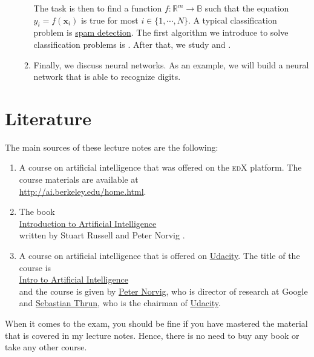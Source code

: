 \begin{enumerate}
\begin{enumerate}
            The task is then to find a function $f:\mathbb{R}^m \rightarrow \mathbb{B}$
            such that the equation $y_i = f(\mathbf{x}_i)$ is true for most $i\in\{1,\cdots,N\}$.  A typical
            classification problem is \href{https://en.wikipedia.org/wiki/Email_spam}{spam detection}.  The
            first algorithm we introduce to solve classification problems is .
            After that, we study  and .
      \item Finally, we discuss neural networks.  As an example, we will build a neural network that is able to
            recognize digits. 
      \end{enumerate}
\end{enumerate}
\pagebreak

\section{Literature}
The main sources of these lecture notes are the following:
\begin{enumerate}
\item A course on artificial intelligence that was offered on the \textsc{edX} platform.  The course
      materials are available at  
      \\[0.2cm]
      \hspace*{1.3cm}
      \href{http://ai.berkeley.edu/home.html}{http://ai.berkeley.edu/home.html}.
\item The book
      \\[0.2cm]
      \hspace*{1.3cm}
      \href{https://www.amazon.de/Artificial-Intelligence-Modern-Approach-Global/dp/1292401133/}{Introduction to Artificial Intelligence}
      \\[0.2cm]
      written by Stuart Russell and Peter Norvig \cite{russell:2020}.
\item A course on artificial intelligence that is offered on \href{https://www.udacity.com}{Udacity}.  The title of the
      course is
      \\[0.2cm]
      \hspace*{1.3cm}
      \href{https://www.udacity.com/course/intro-to-artificial-intelligence--cs271}{Intro to Artificial Intelligence}
      \\[0.2cm]
      and the course is given by \href{https://en.wikipedia.org/wiki/Peter_Norvig}{Peter Norvig}, who is
      director of research at Google and \href{https://en.wikipedia.org/wiki/Sebastian_Thrun}{Sebastian Thrun},
      who is the chairman of \href{https://www.udacity.com}{Udacity}.
\end{enumerate}
When it comes to the exam, you should be fine if you have mastered the material that is covered in my
lecture notes.  Hence, there is no need to buy any book or take any other course.


